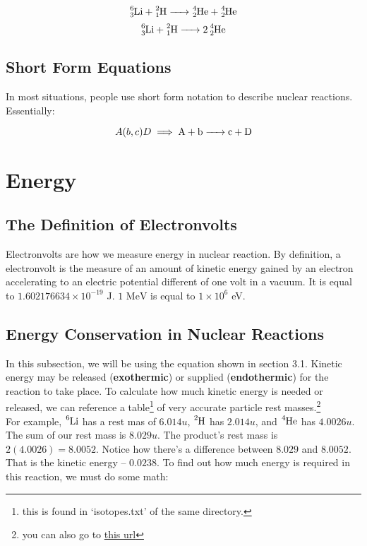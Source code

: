 \documentclass{article}
\begin{document}
\begin{multicols*}{2}
    \[ \ce{^6_3Li + ^2_1H -> ^4_2He + ^4_2He} \]
    \[ \ce{^6_3Li + ^2_1H -> 2 ^4_2He} \]

    \subsection{Short Form Equations}
    In most situations, people use short form notation to describe nuclear reactions.
    Essentially:

    \[ A(b,c)D \implies \ce{A + b -> c + D}\]

    \section{Energy}
    \subsection{The Definition of Electronvolts}
    Electronvolts are how we measure energy in nuclear reaction. By definition,
    a electronvolt is the measure of an amount of kinetic energy gained by
    an electron accelerating to an electric potential different of one volt
    in a vacuum. It is equal to $1.602176634 \times 10^{-19}$ J. $1 \text{ MeV}$
    is equal to $1 \times 10^6$ eV.

    \subsection{Energy Conservation in Nuclear Reactions}
    In this subsection, we will be using the equation shown in section 3.1.
    Kinetic energy may be released (\textbf{exothermic}) or supplied
    (\textbf{endothermic}) for the reaction to take place. To calculate how
    much kinetic energy is needed or released, we can reference a table\footnote{this is found in `isotopes.txt' of the same directory.}
    of very accurate particle rest masses.\footnote{you can also go to \href{https://physics.nist.gov/cgi-bin/Compositions/stand_alone.pl?ele=&all=all&ascii=ascii&isotype=all}{this url}}\\

    For example, $\ce{^6Li}$ has a rest mas of $6.014 u$, $\ce{^2H}$ has
    $2.014 u$, and $\ce{^4He}$ has $4.0026 u$. The sum of our rest mass is
    $8.029 u$. The product's rest mass is $2(4.0026) = 8.0052$. Notice how
    there's a difference between $8.029$ and $8.0052$. That is the kinetic
    energy -- $0.0238$. To find out how much energy is required in this
    reaction, we must do some math:


\end{multicols*}
\end{document}
